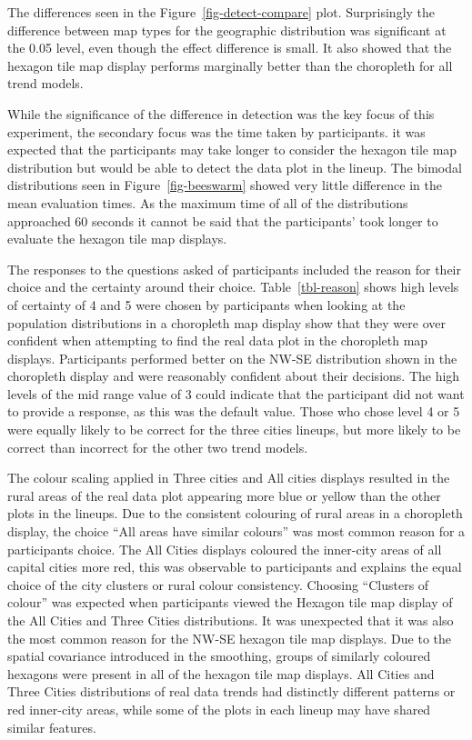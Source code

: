 \documentclass[
doublespace,
  times]{anzsauth}
\begin{document}
The differences seen in the Figure~\ref{fig-detect-compare} plot.
Surprisingly the difference between map types for the geographic
distribution was significant at the 0.05 level, even though the effect
difference is small. It also showed that the hexagon tile map display
performs marginally better than the choropleth for all trend models.

While the significance of the difference in detection was the key focus
of this experiment, the secondary focus was the time taken by
participants. it was expected that the participants may take longer to
consider the hexagon tile map distribution but would be able to detect
the data plot in the lineup. The bimodal distributions seen in
Figure~\ref{fig-beeswarm} showed very little difference in the mean
evaluation times. As the maximum time of all of the distributions
approached 60 seconds it cannot be said that the participants' took
longer to evaluate the hexagon tile map displays.

The responses to the questions asked of participants included the reason
for their choice and the certainty around their choice.
Table~\ref{tbl-reason} shows high levels of certainty of 4 and 5 were
chosen by participants when looking at the population distributions in a
choropleth map display show that they were over confident when
attempting to find the real data plot in the choropleth map displays.
Participants performed better on the NW-SE distribution shown in the
choropleth display and were reasonably confident about their decisions.
The high levels of the mid range value of 3 could indicate that the
participant did not want to provide a response, as this was the default
value. Those who chose level 4 or 5 were equally likely to be correct
for the three cities lineups, but more likely to be correct than
incorrect for the other two trend models.

The colour scaling applied in Three cities and All cities displays
resulted in the rural areas of the real data plot appearing more blue or
yellow than the other plots in the lineups. Due to the consistent
colouring of rural areas in a choropleth display, the choice ``All areas
have similar colours'' was most common reason for a participants choice.
The All Cities displays coloured the inner-city areas of all capital
cities more red, this was observable to participants and explains the
equal choice of the city clusters or rural colour consistency. Choosing
``Clusters of colour'' was expected when participants viewed the Hexagon
tile map display of the All Cities and Three Cities distributions. It
was unexpected that it was also the most common reason for the NW-SE
hexagon tile map displays. Due to the spatial covariance introduced in
the smoothing, groups of similarly coloured hexagons were present in all
of the hexagon tile map displays. All Cities and Three Cities
distributions of real data trends had distinctly different patterns or
red inner-city areas, while some of the plots in each lineup may have
shared similar features.
\end{document}
